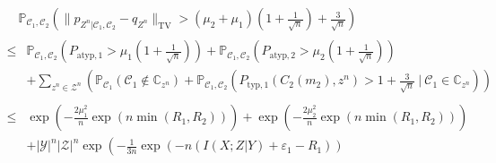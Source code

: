 \documentclass[journal]{IEEEtran}
\newcommand{\channelpmf}{q}
\newcommand{\codebookpmf}{p}
\newcommand{\codebookRateOne}{R_1}
\newcommand{\codebookRateTwo}{R_2}
\newcommand{\channelInOne}{X}
\newcommand{\channelInTwo}{Y}
\newcommand{\channelInTwoAlph}{\mathcal{Y}}
\newcommand{\channelOut}{Z}
\newcommand{\channelOutAlph}{\mathcal{Z}}
\newcommand{\channelOutAlphElement}{z}
\newcommand{\codebookOne}{\mathcal{C}_1}
\newcommand{\codebookTwo}{\mathcal{C}_2}
\newcommand{\codebookTwoWord}[1]{C_2(#1)}
\newcommand{\codebookSet}{\mathbb{C}}
\newcommand{\codewordIndex}{m}
\newcommand{\codebookBlocklength}{n}
\newcommand{\mutualInformationConditional}[3]{I(#1;#2|#3)}
\newcommand{\totalvariation}[1]{\lVert #1 \rVert_\mathrm{TV}}
\newcommand{\Probability}{\mathbb{P}}
\newcommand{\cardinality}[1]{\lvert #1 \rvert}
\newcommand{\typicalityParam}{\varepsilon}
\newcommand{\secondOrderAtypicalProbability}[1]{\mu_{#1}}
\newcommand{\totvarAtypicalOne}{P_{\mathrm{atyp}, 1}}
\newcommand{\totvarAtypicalTwo}{P_{\mathrm{atyp}, 2}}
\newcommand{\totvarTypicalOne}[2]{P_{\mathrm{typ}, 1}({#1},{#2})}
\begin{document}
\begin{align}
\label{proof:soft-covering-two-transmitters-second-order-union-bound-start}
&\phantom{=}
\Probability_{\codebookOne, \codebookTwo} \left( \totalvariation{ \codebookpmf_{\channelOut^\codebookBlocklength | \codebookOne, \codebookTwo} - \channelpmf_{\channelOut^\codebookBlocklength}}
>
(\secondOrderAtypicalProbability{2} + \secondOrderAtypicalProbability{1})
\left(1+\frac{1}{\sqrt{\codebookBlocklength}}\right)
+
\frac{3}{\sqrt{\codebookBlocklength}}
\right) \\
\label{proof:soft-covering-two-transmitters-second-order-union-bound-application}
&
\begin{aligned}
  \leq
  &\Probability_{\codebookOne, \codebookTwo}\left(
    \totvarAtypicalOne > \secondOrderAtypicalProbability{1}\left(1+\frac{1}{\sqrt{\codebookBlocklength}}\right)
  \right)
  +
  \Probability_{\codebookOne, \codebookTwo}\left(
    \totvarAtypicalTwo > \secondOrderAtypicalProbability{2}\left(1+\frac{1}{\sqrt{\codebookBlocklength}}\right)
  \right)
  \\
  &+
  \sum\limits_{\channelOutAlphElement^\codebookBlocklength \in \channelOutAlph^\codebookBlocklength} \left(
    \Probability_{\codebookOne}\left(
      \codebookOne \notin \codebookSet_{\channelOutAlphElement^\codebookBlocklength}
    \right)
    +
    \Probability_{\codebookOne, \codebookTwo}\left(
      \totvarTypicalOne{\codebookTwoWord{\codewordIndex_2}}{\channelOutAlphElement^\codebookBlocklength}
      >
      1 + \frac{3}{\sqrt{\codebookBlocklength}}
      ~|~
      \codebookOne \in \codebookSet_{\channelOutAlphElement^\codebookBlocklength}
    \right)
  \right)
\end{aligned}
\\
\label{proof:soft-covering-two-transmitters-second-order-union-bound-substitutions}
&
\begin{aligned}
  \leq
  &\exp\left(
    -\frac{2\secondOrderAtypicalProbability{1}^2}
          {\codebookBlocklength}
    \exp(\codebookBlocklength \min(\codebookRateOne,\codebookRateTwo))
  \right)
  +
  \exp\left(
    -\frac{2\secondOrderAtypicalProbability{2}^2}
          {\codebookBlocklength}
    \exp(\codebookBlocklength \min(\codebookRateOne,\codebookRateTwo))
  \right)
  \\
  &+
  \cardinality{\channelInTwoAlph}^\codebookBlocklength \cardinality{\channelOutAlph}^\codebookBlocklength
  \exp\left(
    -\frac{1}{3\codebookBlocklength} \exp(-\codebookBlocklength (\mutualInformationConditional{\channelInOne}{\channelOut}{\channelInTwo} + \typicalityParam_1 - \codebookRateOne))

\end{aligned}
\end{align}
\end{document}
